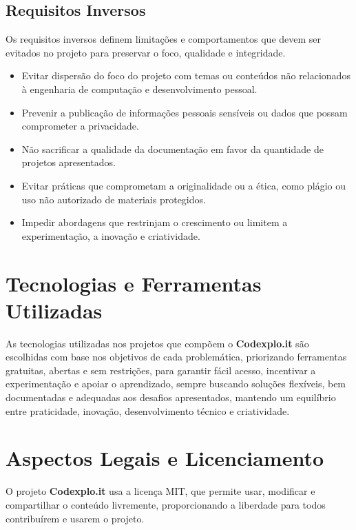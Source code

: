 \documentclass[10pt, a4paper, oneside]{article}
\begin{document}
\subsection{Requisitos Inversos}

Os requisitos inversos definem limitações e comportamentos que devem ser evitados no projeto para preservar o foco, qualidade e integridade.

\begin{itemize}
    \item Evitar dispersão do foco do projeto com temas ou conteúdos não relacionados à engenharia de computação e desenvolvimento pessoal.
    \item Prevenir a publicação de informações pessoais sensíveis ou dados que possam comprometer a privacidade.
    \item Não sacrificar a qualidade da documentação em favor da quantidade de projetos apresentados.
    \item Evitar práticas que comprometam a originalidade ou a ética, como plágio ou uso não autorizado de materiais protegidos.
    \item Impedir abordagens que restrinjam o crescimento ou limitem a experimentação, a inovação e criatividade.
\end{itemize}

\section{Tecnologias e Ferramentas Utilizadas}

As tecnologias utilizadas nos projetos que compõem o \textbf{Codexplo.it} são escolhidas com base nos objetivos de cada problemática, priorizando ferramentas gratuitas, abertas e sem restrições, para garantir fácil acesso, incentivar a experimentação e apoiar o aprendizado, sempre buscando soluções flexíveis, bem documentadas e adequadas aos desafios apresentados, mantendo um equilíbrio entre praticidade, inovação, desenvolvimento técnico e criatividade.



\section{Aspectos Legais e Licenciamento}

O projeto \textbf{Codexplo.it} usa a licença MIT, que permite usar, modificar e compartilhar o conteúdo livremente, proporcionando a liberdade para todos contribuírem e usarem o projeto.
\end{document}
